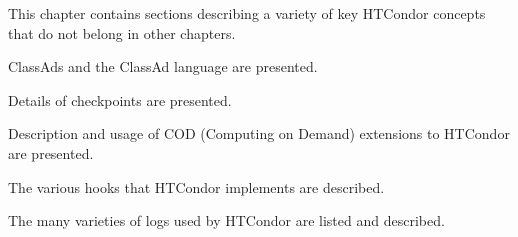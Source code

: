 This chapter contains sections describing a variety of key
HTCondor concepts that do not belong in other chapters.

ClassAds and the ClassAd language are presented.

Details of checkpoints are presented.

Description and usage of COD (Computing on Demand) extensions to HTCondor
are presented.

The various hooks that HTCondor implements are described.

The many varieties of logs used by HTCondor are listed and described.







